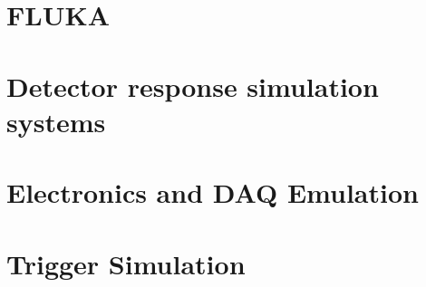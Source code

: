 \section{FLUKA}

\section{Detector response simulation systems}

\section{Electronics and DAQ Emulation}

\section{Trigger Simulation}
